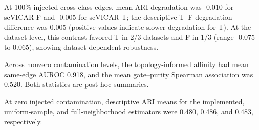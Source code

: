 

At 100\% injected cross-class edges, mean ARI degradation was -0.010 for scVICAR-F and -0.005 for scVICAR-T; the descriptive T--F degradation difference was 0.005 (positive values indicate slower degradation for T). At the dataset level, this contrast favored T in 2/3 datasets and F in 1/3 (range -0.075 to 0.065), showing dataset-dependent robustness.

Across nonzero contamination levels, the topology-informed affinity had mean same-edge AUROC 0.918, and the mean gate--purity Spearman association was 0.520. Both statistics are post-hoc summaries.

At zero injected contamination, descriptive ARI means for the implemented, uniform-sample, and full-neighborhood estimators were 0.480, 0.486, and 0.483, respectively.
